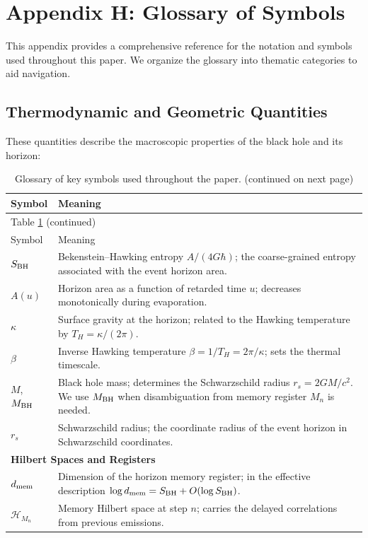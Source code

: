 \documentclass[a4paper,11pt]{article}
\theoremstyle{plain}
\theoremstyle{definition}
\theoremstyle{remark}
\begin{document}
\section{Appendix H: Glossary of Symbols}
\label{app:glossary}

This appendix provides a comprehensive reference for the notation and symbols used throughout this paper. We organize the glossary into thematic categories to aid navigation.

\subsection{Thermodynamic and Geometric Quantities}
These quantities describe the macroscopic properties of the black hole and its horizon:

\begin{longtable}{@{}lp{10cm}@{}}
\caption{Glossary of key symbols used throughout the paper. (continued on next page)}
\label{tab:glossary}\\
\toprule
Symbol & Meaning \\
\midrule
\endfirsthead
\multicolumn{2}{l}{Table \ref{tab:glossary} (continued)}\\
\toprule
Symbol & Meaning \\
\midrule
\endhead
$S_{\rm BH}$ & Bekenstein--Hawking entropy $A/(4G\hbar)$; the coarse-grained entropy associated with the event horizon area. \\
$A(u)$ & Horizon area as a function of retarded time $u$; decreases monotonically during evaporation. \\
$\kappa$ & Surface gravity at the horizon; related to the Hawking temperature by $T_H=\kappa/(2\pi)$. \\
$\beta$ & Inverse Hawking temperature $\beta = 1/T_H = 2\pi/\kappa$; sets the thermal timescale. \\
$M$, $M_{\rm BH}$ & Black hole mass; determines the Schwarzschild radius $r_s = 2GM/c^2$. We use $M_{\rm BH}$ when disambiguation from memory register $M_n$ is needed. \\
$r_s$ & Schwarzschild radius; the coordinate radius of the event horizon in Schwarzschild coordinates. \\
\midrule
\multicolumn{2}{l}{\textbf{Hilbert Spaces and Registers}} \\
\midrule
$d_{\rm mem}$ & Dimension of the horizon memory register; in the effective description $\log d_{\rm mem}=S_{\rm BH}+O(\log S_{\rm BH})$. \\
$\mathcal{H}_{M_n}$ & Memory Hilbert space at step $n$; carries the delayed correlations from previous emissions. \\

\end{longtable}
\end{document}
